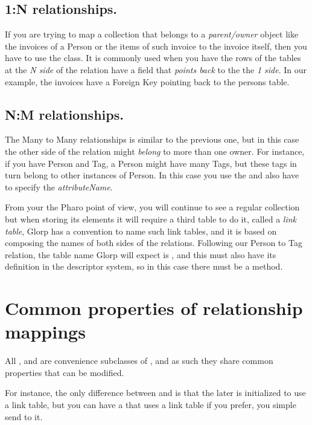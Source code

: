\documentclass[10pt,twoside,english]{_support/latex/sbabook/sbabook}
\begin{document}
\subsection{1:N relationships.}
If you are trying to map a collection that belongs to a \textit{parent/owner} object
like the invoices of a Person or the items of such invoice to the invoice itself,
then you have to use the  class.
It is commonly used when you have the rows of the tables at the \textit{N side} of
the relation have a field that \textit{points back} to the the \textit{1 side}.
In our example, the invoices have a Foreign Key pointing back to the persons table.
\subsection{N:M relationships.}
The Many to Many relationships is similar to the previous one, but in this case
the other side of the relation might \textit{belong} to more than one owner.
For instance, if you have Person and Tag, a Person might have many Tags,
but these tags in turn belong to other instances of Person.
In this case you use the  and also have to specify
the \textit{attributeName}.

From your the Pharo point of view, you will continue to see a regular collection
but when storing its elements it will require a third table to do it, called
a \textit{link table}, Glorp has a convention to name such link tables, and it is
based on composing the names of both sides of the relations.
Following our Person to Tag relation, the table name Glorp will expect is
, and this must also have its definition in the descriptor system,
so in this case there must be a  method.
\section{Common properties of relationship mappings}
All ,  and  are
convenience subclasses of , and as such they share
common properties that can be modified.

For instance, the only difference between  and
 is that the later is initialized to use a link table,
but you can have a  that uses a link table if you prefer,
you simple send  to it.
\end{document}
